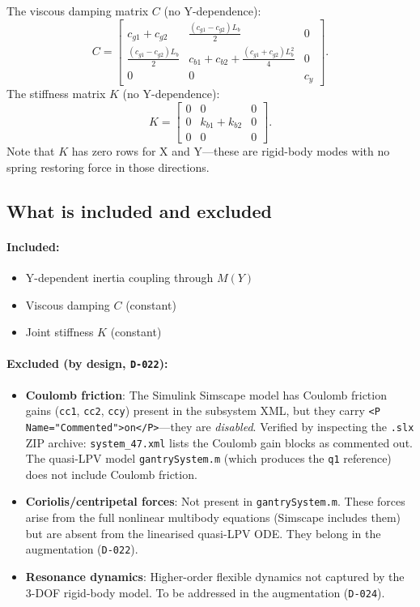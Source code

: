 \documentclass[11pt,a4paper]{article}
\newcommand{\decref}[1]{\texttt{D-#1}}
\begin{document}
The viscous damping matrix $C$ (no Y-dependence):
\begin{equation}
\label{eq:C}
C = \begin{bmatrix}
c_{g1} + c_{g2} & \frac{(c_{g1} - c_{g2}) L_b}{2} & 0 \\[3pt]
\frac{(c_{g1} - c_{g2}) L_b}{2} & c_{b1} + c_{b2} + \frac{(c_{g1} + c_{g2}) L_b^2}{4} & 0 \\[3pt]
0 & 0 & c_y
\end{bmatrix}.
\end{equation}
The stiffness matrix $K$ (no Y-dependence):
\begin{equation}
\label{eq:K}
K = \begin{bmatrix}
0 & 0 & 0 \\
0 & k_{b1} + k_{b2} & 0 \\
0 & 0 & 0
\end{bmatrix}.
\end{equation}
Note that $K$ has zero rows for X and Y---these are rigid-body modes with no spring restoring
force in those directions.

\subsection{What is included and excluded}

\paragraph{Included:}
\begin{itemize}[nosep]
\item Y-dependent inertia coupling through $M(Y)$
\item Viscous damping $C$ (constant)
\item Joint stiffness $K$ (constant)
\end{itemize}

\paragraph{Excluded (by design, \decref{022}):}
\begin{itemize}[nosep]
\item \textbf{Coulomb friction}: The Simulink Simscape model has Coulomb friction gains
  (\texttt{cc1}, \texttt{cc2}, \texttt{ccy}) present in the subsystem XML, but they carry
  \texttt{<P Name="Commented">on</P>}---they are \emph{disabled}. Verified by inspecting the
  \texttt{.slx} ZIP archive: \texttt{system\_47.xml} lists the Coulomb gain blocks as commented
  out. The quasi-LPV model \texttt{gantrySystem.m} (which produces the \texttt{q1} reference)
  does not include Coulomb friction.
\item \textbf{Coriolis/centripetal forces}: Not present in \texttt{gantrySystem.m}. These
  forces arise from the full nonlinear multibody equations (Simscape includes them) but are
  absent from the linearised quasi-LPV ODE. They belong in the augmentation (\decref{022}).
\item \textbf{Resonance dynamics}: Higher-order flexible dynamics not captured by the 3-DOF
  rigid-body model. To be addressed in the augmentation (\decref{024}).
\end{itemize}
\end{document}
